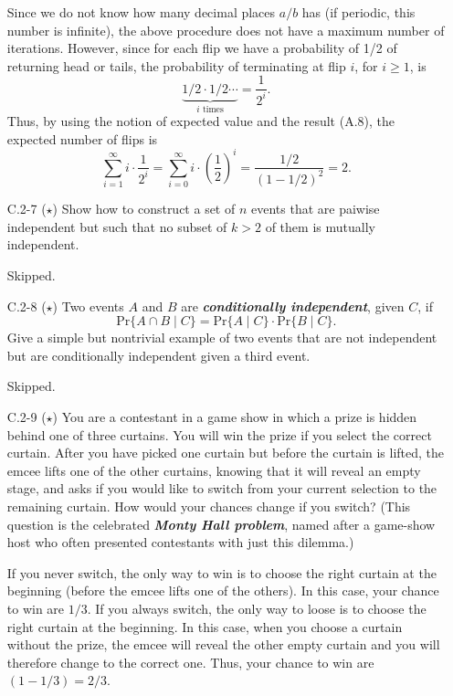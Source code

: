 \documentclass{report}
\makeatletter
\renewenvironment{framed}{%
 \def\FrameCommand##1{\hskip\@totalleftmargin
 \fboxsep=\FrameSep\fbox{##1}}%
 \MakeFramed {\advance\hsize-\width
   \@totalleftmargin\z@ \linewidth\hsize
   \@setminipage}}%
 {\par\unskip\endMakeFramed}
\makeatother
\begin{document}
\begin{enumerate}
\begin{framed}
Since we do not know how many decimal places $a/b$ has (if periodic, this number
is infinite), the above procedure does not have a maximum number of iterations.
However, since for each flip we have a probability of 1/2 of returning head or
tails, the probability of terminating at flip $i$, for $i \ge 1$, is
\[
  \underbrace{1/2 \cdot 1/2 \cdots}_\text{$i$ times} = \frac{1}{2^i}.
\]
Thus, by using the notion of expected value and the result (A.8), the expected number of
flips is
\[
  \sum_{i = 1}^{\infty} i \cdot \frac{1}{2^i}
  = \sum_{i = 0}^{\infty} i \cdot \left(\frac{1}{2}\right)^{i}
  = \frac{1/2}{(1 - 1/2)^2} = 2.
\]

\end{framed}

\item[C.2{-}7] {($\star$) Show how to construct a set of $n$ events that are
  paiwise independent but such that no subset of $k > 2$ of them is mutually
  independent.}

\begin{framed}
Skipped.
\end{framed}

\item[C.2{-}8] {($\star$) Two events $A$ and $B$ are \textbf{\emph{conditionally
  independent}}, given $C$, if
  \[
    \text{Pr}\{A \cap B\;|\;C\} = \text{Pr}\{A\;|\;C\} \cdot \text{Pr}\{B\;|\;C\}.
  \]
  Give a simple but nontrivial example of two events that are not independent
  but are conditionally independent given a third event.
}

\begin{framed}
Skipped.
\end{framed}

\newpage

\item[C.2{-}9] {($\star$) You are a contestant in a game show in which a prize
  is hidden behind one of three curtains. You will win the prize if you select
  the correct curtain. After you have picked one curtain but before the curtain
  is lifted, the emcee lifts one of the other curtains, knowing that it will
  reveal an empty stage, and asks if you would like to switch from your current
  selection to the remaining curtain. How would your chances change if you
  switch? (This question is the celebrated \textbf{\emph{Monty Hall problem}},
  named after a game-show host who often presented contestants with just this
  dilemma.)}

\begin{framed}
If you never switch, the only way to win is to choose the right curtain at the
beginning (before the emcee lifts one of the others). In this case, your chance
to win are $1/3$. If you always switch, the only way to loose is to choose the
right curtain at the beginning. In this case, when you choose a curtain without
the prize, the emcee will reveal the other empty curtain and you will
therefore change to the correct one. Thus, your chance to win are $(1
- 1/3) = 2/3$.
\end{framed}


\end{enumerate}
\end{document}
